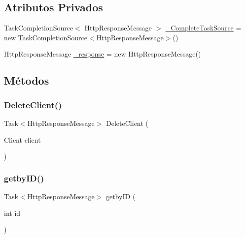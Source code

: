 \subsection*{Atributos Privados}
\begin{DoxyCompactItemize}
\item 
Task\+Completion\+Source$<$ Http\+Response\+Message $>$ \hyperlink{classApi3Layers_1_1Controllers_1_1ClientController_a467fbe1f298526ce8f849c2cd8f8fa4e}{\+\_\+\+Complete\+Task\+Source} = new Task\+Completion\+Source$<$Http\+Response\+Message$>$()
\item 
Http\+Response\+Message \hyperlink{classApi3Layers_1_1Controllers_1_1ClientController_addf535da0da455d00a0bd7a519f618cb}{\+\_\+response} = new Http\+Response\+Message()
\end{DoxyCompactItemize}


\subsection{Métodos}
\mbox{\label{classApi3Layers_1_1Controllers_1_1ClientController_a9313f9369acc70d20109a5e2621486fd}} 
\subsubsection{\texorpdfstring{Delete\+Client()}{DeleteClient()}}
{\footnotesize\ttfamily Task$<$Http\+Response\+Message$>$ Delete\+Client (\begin{DoxyParamCaption}\item[{Client}]{client }\end{DoxyParamCaption})}

\mbox{\label{classApi3Layers_1_1Controllers_1_1ClientController_a63543b21b5d71a250f5c2e251e1725eb}} 
\subsubsection{\texorpdfstring{getby\+I\+D()}{getbyID()}}
{\footnotesize\ttfamily Task$<$Http\+Response\+Message$>$ getby\+ID (\begin{DoxyParamCaption}\item[{int}]{id }\end{DoxyParamCaption})}

